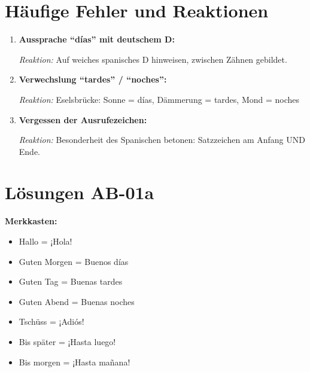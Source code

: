 \documentclass[11pt,a4paper]{article}
\begin{document}
\vspace{1.5em}

\section*{Häufige Fehler und Reaktionen}

\begin{enumerate}[leftmargin=*, nosep]
    \item \textbf{Aussprache ``días'' mit deutschem D:}

    \textit{Reaktion:} Auf weiches spanisches D hinweisen, zwischen Zähnen gebildet.

    \item \textbf{Verwechslung ``tardes'' / ``noches'':}

    \textit{Reaktion:} Eselsbrücke: Sonne = días, Dämmerung = tardes, Mond = noches

    \item \textbf{Vergessen der Ausrufezeichen:}

    \textit{Reaktion:} Besonderheit des Spanischen betonen: Satzzeichen am Anfang UND Ende.
\end{enumerate}

\vspace{1.5em}

\section*{Lösungen AB-01a}

\textbf{Merkkasten:}
\begin{itemize}[nosep, leftmargin=*]
    \item Hallo = ¡Hola!
    \item Guten Morgen = Buenos días
    \item Guten Tag = Buenas tardes
    \item Guten Abend = Buenas noches
    \item Tschüss = ¡Adiós!
    \item Bis später = ¡Hasta luego!
    \item Bis morgen = ¡Hasta mañana!
\end{itemize}
\end{document}
